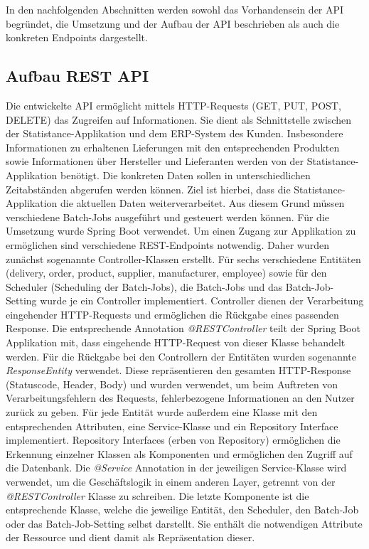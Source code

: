 In den nachfolgenden Abschnitten werden sowohl das Vorhandensein der API begründet, die Umsetzung und der Aufbau der API beschrieben als auch die konkreten Endpoints dargestellt.

\subsection{Aufbau REST API}\label{subsubsec:RestAPI}
Die entwickelte API ermöglicht mittels HTTP-Requests (GET, PUT, POST, DELETE) das Zugreifen auf Informationen. Sie dient als Schnittstelle zwischen der Statistance-Applikation und dem ERP-System des Kunden. Insbesondere Informationen zu erhaltenen Lieferungen mit den entsprechenden Produkten sowie Informationen über Hersteller und Lieferanten werden von der Statistance- Applikation benötigt. Die konkreten Daten sollen in unterschiedlichen Zeitabständen abgerufen werden können. Ziel ist hierbei, dass die Statistance-Applikation die aktuellen Daten weiterverarbeitet. Aus diesem Grund müssen verschiedene Batch-Jobs ausgeführt und gesteuert werden können. Für die Umsetzung wurde Spring Boot verwendet. \cite{springboot} Um einen Zugang zur Applikation zu ermöglichen sind verschiedene REST-Endpoints notwendig. Daher wurden zunächst sogenannte Controller-Klassen erstellt. Für sechs verschiedene Entitäten (delivery, order, product, supplier, manufacturer, employee) sowie für den Scheduler (Scheduling der Batch-Jobs), die Batch-Jobs und das Batch-Job-Setting wurde je ein Controller implementiert. Controller dienen der Verarbeitung eingehender HTTP-Requests und ermöglichen die Rückgabe eines passenden Response. Die entsprechende Annotation \textit{@RESTController} teilt der Spring Boot Applikation mit, dass eingehende HTTP-Request von dieser Klasse behandelt werden. 
Für die Rückgabe bei den Controllern der Entitäten wurden sogenannte \textit{ResponseEntity} verwendet. Diese repräsentieren den gesamten HTTP-Response (Statuscode, Header, Body) und wurden verwendet, um beim Auftreten von Verarbeitungsfehlern des Requests, fehlerbezogene Informationen an den Nutzer zurück zu geben. \cite{springbaeldung} Für jede Entität wurde außerdem eine Klasse mit den entsprechenden Attributen, eine Service-Klasse und ein Repository Interface implementiert.
Repository Interfaces (erben von Repository) ermöglichen die Erkennung einzelner Klassen als Komponenten und ermöglichen den Zugriff auf die Datenbank. 
Die \textit{@Service} Annotation in der jeweiligen Service-Klasse wird verwendet, um die Geschäftslogik in einem anderen Layer, getrennt von der \textit{@RESTController} Klasse zu schreiben. \cite{springtutorialspoint} 
Die letzte Komponente ist die entsprechende Klasse, welche die jeweilige Entität, den Scheduler, den Batch-Job oder das Batch-Job-Setting selbst darstellt. Sie enthält die notwendigen Attribute der Ressource und dient damit als Repräsentation dieser.
